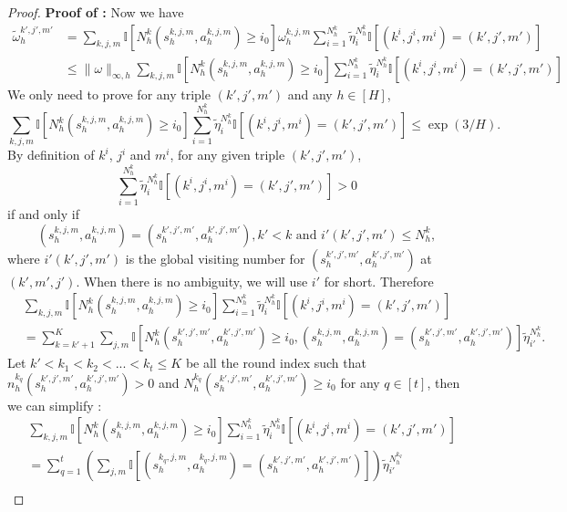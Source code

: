 \documentclass{article}
\begin{document}
\begin{proof}
\textbf{Proof of :} 
Now we have
\begin{align*}
    \tilde{\omega}_{h}^{k',j',m'} &= \sum_{k,j,m}\mathbb{I}\left[N_h^k(s_{h}^{k,j,m},a_{h}^{k,j,m}) \geq i_0 \right]\omega_{h}^{k,j,m}\sum_{i = 1}^{N_h^k}\tilde{\eta}_i^{N_h^k}\mathbb{I}\left[(k^i,j^i,m^i) = (k',j',m') \right] \\
    &\leq \|\omega\|_{\infty,h}\sum_{k,j,m}\mathbb{I}\left[N_h^k(s_{h}^{k,j,m},a_{h}^{k,j,m}) \geq i_0 \right]\sum_{i = 1}^{N_h^k}\tilde{\eta}_i^{N_h^k}\mathbb{I}\left[(k^i,j^i,m^i) = (k',j',m') \right]
\end{align*}
We only need to prove for any triple $(k',j',m')$ and any $h\in [H]$,
\begin{equation}
    \label{inftygoal}
    \sum_{k,j,m}\mathbb{I}\left[N_h^k(s_{h}^{k,j,m},a_{h}^{k,j,m}) \geq i_0 \right]\sum_{i = 1}^{N_h^k}\tilde{\eta}_i^{N_h^k}\mathbb{I}\left[(k^i,j^i,m^i) = (k',j',m') \right] \leq \exp(3/H).
\end{equation}
By definition of $k^i$, $j^i$ and $m^i$, for any given triple $(k',j',m')$, $$\sum_{i = 1}^{N_h^k}\tilde{\eta}_i^{N_h^k}\mathbb{I}\left[(k^i,j^i,m^i) = (k',j',m') \right] > 0$$ if and only if $$(s_h^{k,j,m}, a_h^{k,j,m}) = (s_h^{k',j',m'}, a_h^{k',j',m'}), k'<k \text{ and } i'(k',j',m') \leq N_h^k,$$ where $i'(k',j',m')$ is the global visiting number for $(s_h^{k',j',m'}, a_h^{k',j',m'})$ at $(k',m',j')$. When there is no ambiguity, we will use $i'$ for short. Therefore
\begin{align}
    &\sum_{k,j,m}\mathbb{I}\left[N_h^k(s_{h}^{k,j,m},a_{h}^{k,j,m}) \geq i_0 \right]\sum_{i = 1}^{N_h^k}\tilde{\eta}_i^{N_h^k}\mathbb{I}\left[(k^i,j^i,m^i) = (k',j',m') \right] \nonumber\\
    & = \sum_{k = k'+1}^K\sum_{j,m}\mathbb{I}\left[N_h^k(s_h^{k',j',m'}, a_h^{k',j',m'}) \geq i_0, (s_h^{k,j,m}, a_h^{k,j,m}) = (s_h^{k',j',m'}, a_h^{k',j',m'}) \right]\tilde{\eta}_{i'}^{N_h^k}. \label{tildeinfty1}
 \end{align}
Let $k' < k_1 <k_2 < ... < k_t \leq K$ be all the round index such that $n_h^{k_q}(s_h^{k',j',m'}, a_h^{k',j',m'}) >0$ and $N_h^{k_q}(s_h^{k',j',m'}, a_h^{k',j',m'}) \geq i_0$ for any $q \in [t]$, then we can simplify :
\begin{align}
\label{tildeinfty2}
    &\sum_{k,j,m}\mathbb{I}\left[N_h^k(s_{h}^{k,j,m},a_{h}^{k,j,m}) \geq i_0 \right]\sum_{i = 1}^{N_h^k}\tilde{\eta}_i^{N_h^k}\mathbb{I}\left[(k^i,j^i,m^i) = (k',j',m') \right] \nonumber\\
    &= \sum_{q = 1}^t\left(\sum_{j,m}\mathbb{I}\left[(s_h^{k_q,j,m}, a_h^{k_q,j,m}) = (s_h^{k',j',m'}, a_h^{k',j',m'}) \right]\right)\tilde{\eta}_{i'}^{N_h^{k_q}} \nonumber \\

\end{align}
\end{proof}
\end{document}
